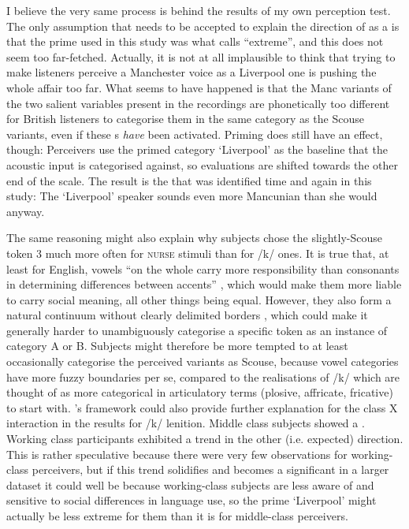 I believe the very same process is behind the results of my own perception test.
The only assumption that needs to be accepted to explain the direction of  as a  is that the prime used in this study was what \citeauthor{herr1986} calls ``extreme'', and this does not seem too far-fetched.
Actually, it is not at all implausible to think that trying to make listeners perceive a Manchester voice as a Liverpool one is pushing the whole affair too far.
What seems to have happened is that the Manc variants of the two salient variables present in the recordings are phonetically too different for British listeners to categorise them in the same category as the Scouse variants, even if these s \emph{have} been activated.
Priming does still have an effect, though: Perceivers use the primed category `Liverpool' as the baseline that the acoustic input is categorised against, so evaluations are shifted towards the other end of the scale.
The result is the  that was identified time and again in this study: The `Liverpool' speaker sounds even more Mancunian than she would anyway.

The same reasoning might also explain why subjects chose the slightly-Scouse token 3 much more often for \textsc{nurse} stimuli than for /k/ ones.
It is true that, at least for English, vowels ``on the whole carry more responsibility than consonants in determining differences between accents'' \parencite[12]{foulkesdocherty1999a}, which would make them more liable to carry social meaning, all other things being equal.
However, they also form a natural continuum without clearly delimited borders \parencite[cf.][12]{foulkesdocherty1999a}, which could make it generally harder to unambiguously categorise a specific token as an instance of category A or B.
Subjects might therefore be more tempted to at least occasionally categorise the perceived variants as Scouse, because vowel categories have more fuzzy boundaries per se, compared to the realisations of /k/ which are thought of as more categorical in articulatory terms (plosive, affricate, fricative) to start with.
\citeauthor{herr1986}'s framework could also provide further explanation for the class X  interaction in the results for /k/ lenition.
Middle class subjects showed a .
Working class participants exhibited a trend in the other (i.e. expected) direction.
This is rather speculative because there were very few observations for working-class perceivers, but if this trend solidifies and becomes a significant  in a larger dataset it could well be because working-class subjects are less aware of and sensitive to social differences in language use, so the prime `Liverpool' might actually be less extreme for them than it is for middle-class perceivers.

